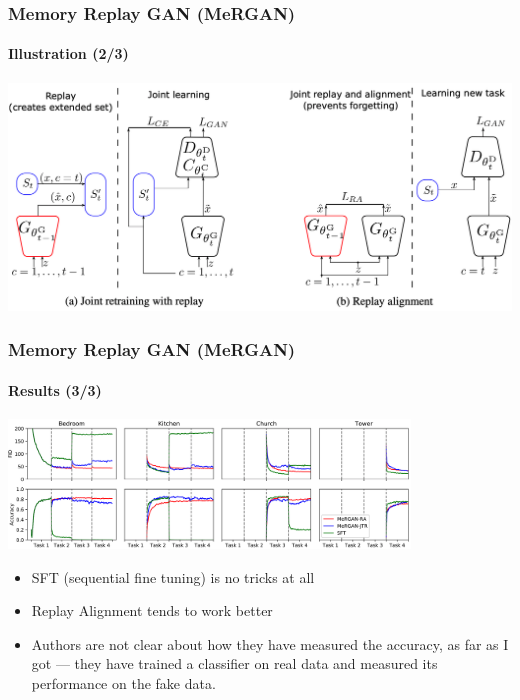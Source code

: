 \documentclass[10pt]{beamer}
\begin{document}
\begin{frame}
    \frametitle{Memory Replay GAN (MeRGAN)}
    \framesubtitle{Illustration (2/3)}
    
    \centering
    \includegraphics[width=\textwidth]{images/mergan.png}
\end{frame}

\begin{frame}
    \frametitle{Memory Replay GAN (MeRGAN)}
    \framesubtitle{Results (3/3)}
    
    \centering
    \includegraphics[width=0.8\textwidth]{images/mergan-results}
    
    \begin{itemize}
        \item SFT (sequential fine tuning) is no tricks at all
        \item Replay Alignment tends to work better
        \item Authors are not clear about how they have measured the accuracy, as far as I got --- they have trained a classifier on real data and measured its performance on the fake data.
    \end{itemize}
\end{frame}
\end{document}
